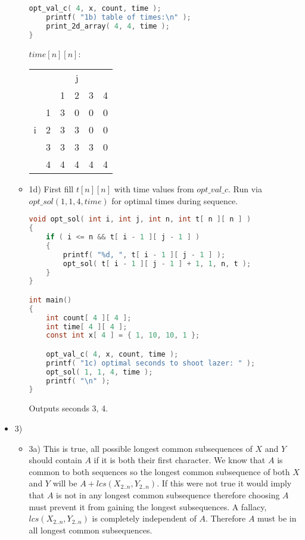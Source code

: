 \documentclass[ 12pt ]{article}
\begin{document}
\begin{itemize}
\begin{itemize}
\begin{lstlisting}[language=C]
	opt_val_c( 4, x, count, time );
	printf( "1b) table of times:\n" );
	print_2d_array( 4, 4, time );
}
		\end{lstlisting}
		\begin{center}
		$time[n][n]$:
			\begin{tabular}{ |cc|cccc| }
			\hline
			  &   &   & j &   &   \\
			  &   & 1 & 2 & 3 & 4 \\
			\hline
			  & 1 & 3 & 0 & 0 & 0 \\ 
			i & 2 & 3 & 3 & 0 & 0 \\
			  & 3 & 3 & 3 & 3 & 0 \\
			  & 4 & 4 & 4 & 4 & 4 \\
			\hline
			\end{tabular}
			\newline
		\end{center}

		\item[] {\large 1d)}
		First fill $t[n][n]$ with time values from $opt\_val\_c$. Run via $opt\_sol(1,1,4,time)$ for optimal times during sequence.
		\begin{lstlisting}[language=C]
void opt_sol( int i, int j, int n, int t[ n ][ n ] )
{
	if ( i <= n && t[ i - 1 ][ j - 1 ] )
	{
		printf( "%d, ", t[ i - 1 ][ j - 1 ] );
		opt_sol( t[ i - 1 ][ j - 1 ] + 1, 1, n, t );
	}
}

int main()
{
	int count[ 4 ][ 4 ];
	int time[ 4 ][ 4 ];
	const int x[ 4 ] = { 1, 10, 10, 1 };

	opt_val_c( 4, x, count, time );
	printf( "1c) optimal seconds to shoot lazer: " );
	opt_sol( 1, 1, 4, time );
	printf( "\n" );
}
		\end{lstlisting}
		Outputs seconds 3, 4. \\
	\end{itemize}

	\item[] {\large 3)}
	\begin{itemize}
		\item[] {\large 3a)}
		This is true, all possible longest common subsequences of $X$ and $Y$ should contain $A$ if it is both their first character.
		We know that $A$ is common to both sequences so the longest common subsequence of both $X$ and $Y$ will be $A + lcs(X_{2..n}, Y_{2..n})$.
		If this were not true it would imply that $A$ is not in any longest common subsequence therefore choosing $A$ must prevent it from
		gaining the longest subsequences. A fallacy, $lcs(X_{2..n}, Y_{2..n})$ is completely independent of $A$. Therefore $A$ must be in
		all longest common subsequences. \\


\end{itemize}
\end{itemize}
\end{document}
